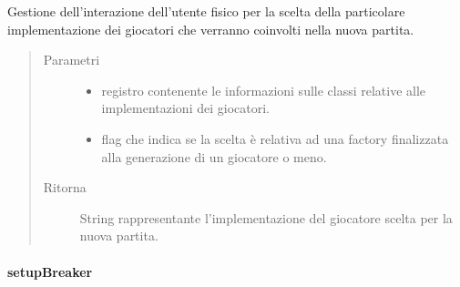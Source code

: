 \documentclass[letterpaper,10pt,italian,openany,oneside]{sphinxmanual}
\begin{document}
\begin{fulllineitems}
\label{\detokenize{source/it/unicam/cs/pa/mastermind/ui/StartView:it.unicam.cs.pa.mastermind.ui.StartView.getPlayerName(PlayerFactoryRegistry, boolean)}}
Gestione dell’interazione dell’utente fisico per la scelta della particolare implementazione dei giocatori che verranno coinvolti nella nuova partita.
\begin{quote}\begin{description}
\item[{Parametri}] \leavevmode\begin{itemize}
\item {} 
 \textendash{} registro contenente le informazioni sulle classi  relative alle implementazioni dei giocatori.

\item {} 
 \textendash{} flag che indica se la scelta è relativa ad una factory finalizzata alla generazione di un giocatore  o meno.

\end{itemize}

\item[{Ritorna}] \leavevmode
String rappresentante l’implementazione del giocatore scelta per la nuova partita.

\end{description}\end{quote}

\end{fulllineitems}



\paragraph{setupBreaker}
\label{\detokenize{source/it/unicam/cs/pa/mastermind/ui/StartView:setupbreaker}}
\end{document}
